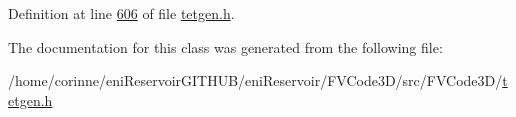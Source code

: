 Definition at line \hyperlink{tetgen_8h_source_l00606}{606} of file \hyperlink{tetgen_8h_source}{tetgen.\+h}.



The documentation for this class was generated from the following file\+:\begin{DoxyCompactItemize}
\item 
/home/corinne/eni\+Reservoir\+G\+I\+T\+H\+U\+B/eni\+Reservoir/\+F\+V\+Code3\+D/src/\+F\+V\+Code3\+D/\hyperlink{tetgen_8h}{tetgen.\+h}\end{DoxyCompactItemize}
